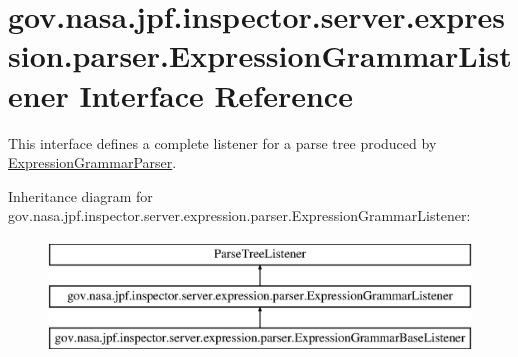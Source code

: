 \hypertarget{interfacegov_1_1nasa_1_1jpf_1_1inspector_1_1server_1_1expression_1_1parser_1_1_expression_grammar_listener}{}\section{gov.\+nasa.\+jpf.\+inspector.\+server.\+expression.\+parser.\+Expression\+Grammar\+Listener Interface Reference}
\label{interfacegov_1_1nasa_1_1jpf_1_1inspector_1_1server_1_1expression_1_1parser_1_1_expression_grammar_listener}


This interface defines a complete listener for a parse tree produced by \hyperlink{classgov_1_1nasa_1_1jpf_1_1inspector_1_1server_1_1expression_1_1parser_1_1_expression_grammar_parser}{Expression\+Grammar\+Parser}.  


Inheritance diagram for gov.\+nasa.\+jpf.\+inspector.\+server.\+expression.\+parser.\+Expression\+Grammar\+Listener\+:\begin{figure}[H]
\begin{center}
\leavevmode
\includegraphics[height=3.000000cm]{interfacegov_1_1nasa_1_1jpf_1_1inspector_1_1server_1_1expression_1_1parser_1_1_expression_grammar_listener}
\end{center}
\end{figure}
